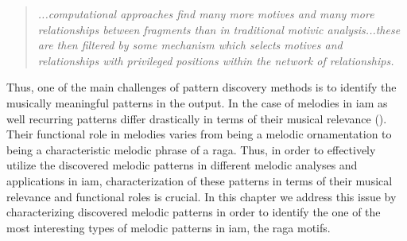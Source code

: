 \blockquote{\textit{...computational approaches find many more motives and many more relationships between fragments than in traditional motivic analysis...these are then filtered by some mechanism which selects motives and relationships with privileged positions within the network of relationships.}}

Thus, one of the main challenges of pattern discovery methods is to identify the musically meaningful patterns in the output. In the case of melodies in \gls{iam} as well recurring patterns differ drastically in terms of their musical relevance (). Their functional role in melodies varies from being a melodic ornamentation to being a characteristic melodic phrase of a \gls{raga}. Thus, in order to effectively utilize the discovered melodic patterns in different melodic analyses and applications in \gls{iam}, characterization of these patterns in terms of their musical relevance and functional roles is crucial. In this chapter we address this issue by characterizing discovered melodic patterns in order to identify the one of the most interesting types of melodic patterns in \gls{iam}, the \gls{raga} motifs.
 
